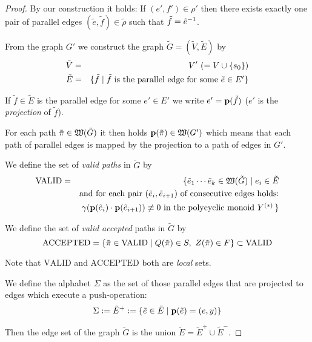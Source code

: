 \begin{proof}
By our construction it holds:
If $(e', f') \in \rho'$ then there exists exactly one pair of parallel edges
$(\tilde e, \tilde f) \in \tilde\rho$ such that $\tilde f = \mbox{${\tilde e}^{-1}$}$.

From the graph $G'$ we construct the graph $\tilde{G} = (\tilde{V}, \tilde{E})$
by
\begin{eqnarray*}
\tilde{V} &=& V' \ (=V \cup \mbox{$\{s_0\}$}) \\
\tilde{E} &=& \mbox{$\{\tilde f \mid \tilde f \text{ is the parallel edge for some
}\tilde e \in E'\}$}
\end{eqnarray*}

If $\tilde f \in \tilde{E}$ is the parallel edge for some $e' \in E'$ we write
$e' = \mathbf{p}({\tilde f})$ ($e'$ is the {\em projection} of $\tilde f$). 

For each path $\tilde{\pi} \in \mbox{$\mathfrak{W}({\tilde{G}})$}$ it then holds
$\mathbf{p}({\tilde{\pi}}) \in \mbox{$\mathfrak{W}({G'})$}$ which means that each path of parallel
edges is mapped by the projection to a path of edges in $G'$.

\newcommand{\validpaths}{\mathrm{VALID}}
We define the set of {\em valid paths} in $\tilde{G}$ by
\begin{eqnarray*}
\validpaths &=& \{ \tilde e_1 \cdots \tilde e_k \in \pathcat{\tilde{G}}
\mid e_i \in \tilde{E} \\
& & \text{and for each pair }(\tilde e_i, \tilde e_{i+1})\text{ of consecutive
edges holds:}\\
& & \gamma(\proj{\tilde{e}_i} \cdot \proj{\tilde{e}_{i+1}}) \not\equiv 0\text{
in the polycyclic monoid }\pocymon{Y} \,\}
\end{eqnarray*} 

\newcommand{\acceptedpaths}{\mathrm{ACCEPTED}}
We define the set of {\em valid accepted} paths in $\tilde{G}$ by
\begin{equation*}
\acceptedpaths = \setof{\tilde\pi \in \validpaths \mid Q(\tilde\pi) \in
S,\ Z(\tilde\pi) \in F} \subset \validpaths
\end{equation*}

Note that $\validpaths$ and $\acceptedpaths$ both are {\em local} sets.

We define the alphabet $\Sigma$ as the set of those parallel edges that are
projected to edges which execute a push-operation:
\begin{equation*}
\Sigma := \tilde{E}^+ := \mbox{$\{\tilde e \in \tilde{E} \mid \mathbf{p}({\tilde e}) =
(e, y)\}$}
\end{equation*}

Then the edge set of the graph $\tilde{G}$ is the union $\tilde{E} =
\tilde{E}^+ \cup \tilde{E}^-$.


\end{proof}
